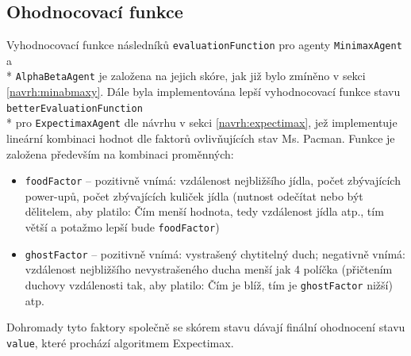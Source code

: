 \subsection*{Ohodnocovací funkce}
Vyhodnocovací funkce následníků \texttt{evaluationFunction} pro agenty \texttt{MinimaxAgent} a \\* \texttt{AlphaBetaAgent} je založena na jejich skóre, jak již bylo zmíněno v sekci \ref{navrh:minabmaxy}.
Dále byla implementována lepší vyhodnocovací funkce stavu \texttt{betterEvaluationFunction} \\* pro \texttt{ExpectimaxAgent} dle návrhu v sekci \ref{navrh:expectimax}, jež implementuje lineární kombinaci hodnot dle faktorů ovlivňujících stav Ms. Pacman. Funkce je založena především na kombinaci proměnných:
\begin{itemize}
  \item \texttt{foodFactor} -- pozitivně vnímá: vzdálenost nejbližšího jídla, počet zbývajících power-upů, počet zbývajících kuliček jídla (nutnost odečítat nebo být dělitelem, aby platilo: Čím menší hodnota, tedy vzdálenost jídla atp., tím větší a potažmo lepší bude \texttt{foodFactor}) 
  \item \texttt{ghostFactor} -- pozitivně vnímá: vystrašený chytitelný duch; negativně vnímá: vzdálenost nejbližšího nevystrašeného ducha menší jak 4 políčka (přičtením duchovy vzdálenosti tak, aby platilo: Čím je blíž, tím je \texttt{ghostFactor} nižší) atp.
\end{itemize}
Dohromady tyto faktory společně se skórem stavu dávají finální ohodnocení stavu \texttt{value}, které prochází algoritmem Expectimax.

